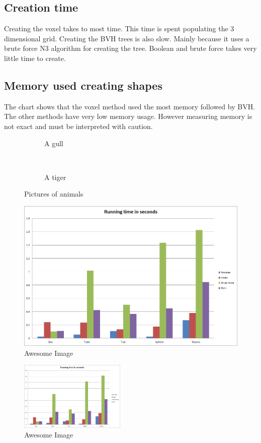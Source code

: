 \documentclass[11pt,twoside,a4paper]{report}
\begin{document}
\subsection{Creation time}
Creating the voxel  takes to most time. This time is spent populating the 3 dimensional grid. Creating the BVH trees is also slow. Mainly because it uses a brute force N3 algorithm for creating the tree. Boolean and brute force takes very little time to create.

\subsection{Memory used creating shapes}
The chart shows that the voxel method used the most memory followed by BVH. The other methods have very low memory usage. However measuring memory is not exact and must be interpreted with caution. 

\begin{figure}[h]
        \centering
        \begin{subfigure}[h]{0.3\textwidth}
                \caption{A gull}
                \label{fig:gull}
        \end{subfigure}%
        ~ %
        \begin{subfigure}[h]{0.3\textwidth}
                \caption{A tiger}
                \label{fig:tiger}
        \end{subfigure}
        \caption{Pictures of animals}\label{fig:animals}
\end{figure}


\begin{figure}[h]
    \centering
    \includegraphics[width=0.45\linewidth]{images/running_time_seconds}
    \caption{Awesome Image}
    \label{fig:awesome_image1}
\end{figure}
\begin{figure}[h]
    \centering
    \includegraphics[width=0.45\textwidth]{images/running_time_seconds}
    \caption{Awesome Image}
    \label{fig:awesome_image2}
\end{figure}
\end{document}
